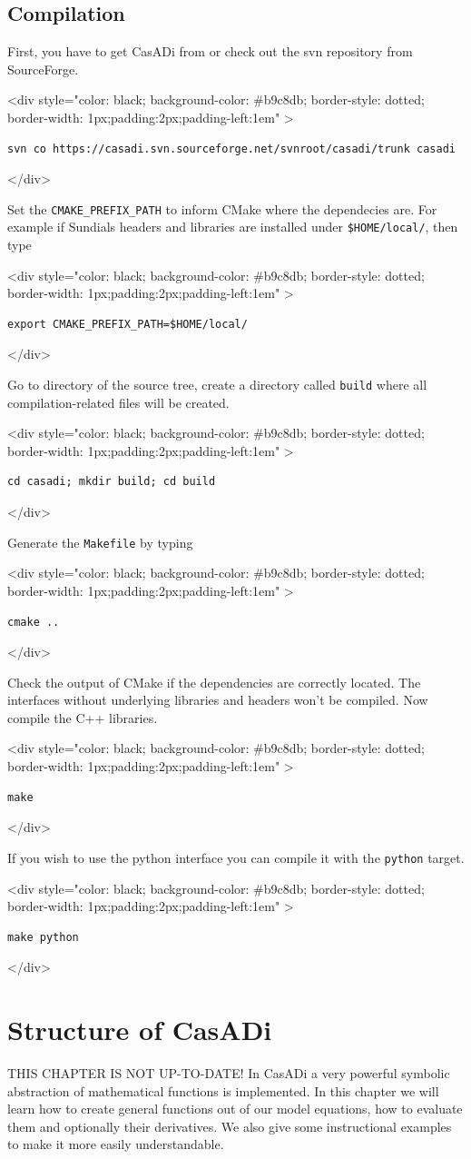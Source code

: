 \documentclass[a4paper,12pt]{book}
\newcommand{\codebegin}{
\begin{rawhtml}
<div style="color: black; background-color: \#b9c8db;  border-style: dotted; border-width: 1px;padding:2px;padding-left:1em" >
\end{rawhtml}
}
\newcommand{\codeend}{
\begin{rawhtml}
</div>
\end{rawhtml}
}
\newcommand{\codebegin}{

}
\newcommand{\codeend}{

}
\begin{document}
\section{Compilation}
First, you have to get CasADi from  or check out the svn repository from SourceForge.
\par
\codebegin
\begin{verbatim}
svn co https://casadi.svn.sourceforge.net/svnroot/casadi/trunk casadi
\end{verbatim}
\codeend
Set the \texttt{CMAKE\_PREFIX\_PATH} to inform CMake where the dependecies are. 
For example if Sundials headers and libraries are installed under \texttt{\$HOME/local/}, then type
\par
\codebegin{
\begin{verbatim}
export CMAKE_PREFIX_PATH=$HOME/local/
\end{verbatim}
\codeend
\par
Go to directory of the source tree, create a directory called \texttt{build} where all compilation-related files will be created.
\par
\codebegin
\begin{verbatim}
cd casadi; mkdir build; cd build
\end{verbatim}
\codeend
Generate the \texttt{Makefile} by typing
\par
\codebegin
\begin{verbatim}
cmake ..
\end{verbatim}
\codeend
Check the output of CMake if the dependencies are correctly located. The interfaces without underlying libraries and headers won't be compiled.
Now compile the C++ libraries.
\par
\codebegin
\begin{verbatim}
make
\end{verbatim}
\codeend
If you wish to use the python interface you can compile it with the \texttt{python} target.
\par
\codebegin
\begin{verbatim}
make python
\end{verbatim}
\codeend

\chapter{Structure of CasADi}
{\color{red}THIS CHAPTER IS NOT UP-TO-DATE!}
In CasADi a very powerful symbolic abstraction of mathematical functions is implemented.
In this chapter we will learn how to create general functions out of our model equations, 
how to evaluate them and optionally their derivatives. We also give some instructional
examples to make it more easily understandable.

}
\end{document}
